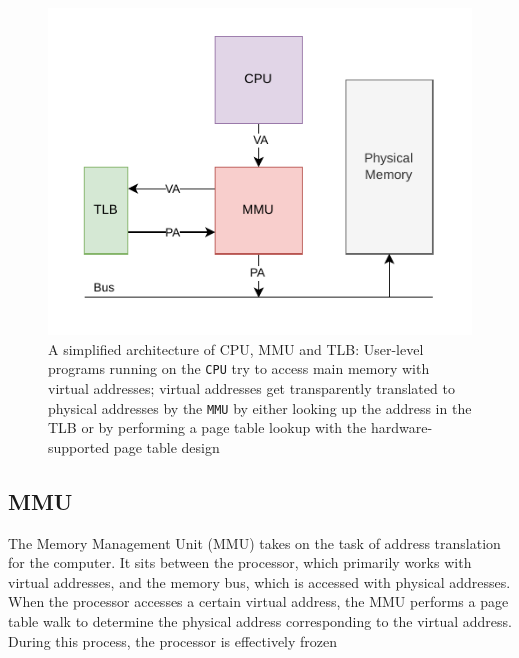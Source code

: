 \begin{figure}[t]
    \centering
    \includegraphics[scale=1.2]{figures/simple_mmu_arch.pdf}
    \caption[A simplified architecture of CPU, MMU and TLB]{A simplified architecture of CPU, MMU and TLB:
        User-level programs running on the \texttt{CPU} try to access main memory with virtual
        addresses; virtual addresses get transparently translated to physical addresses by the
        \texttt{MMU} by either looking up the address in the TLB or by performing a page table
        lookup with the hardware-supported page table design}
    \label{fig:fund:simplearch}
\end{figure}


\subsection{MMU}
The Memory Management Unit (MMU) takes on the task of address translation for the computer.
It sits between the processor, which primarily works with virtual addresses, and the memory bus,
which is accessed with physical addresses. When the processor accesses a certain virtual address,
the MMU performs a page table walk to determine the physical address corresponding to the virtual
address. During this process, the processor is effectively frozen \cite{jacobVirtualMemoryContemporary1998}

